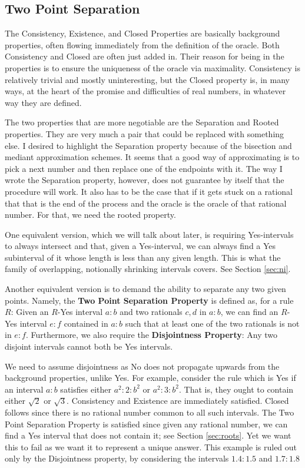 \documentclass[12pt]{article}
\begin{document}
\subsection{Two Point Separation}

The Consistency, Existence, and Closed Properties are basically background properties, often flowing immediately from the definition of the oracle. Both Consistency and Closed are often just added in. Their reason for being in the properties is to ensure the uniqueness of the oracle via maximality. Consistency is relatively trivial and mostly uninteresting, but the Closed property is, in many ways, at the heart of the promise and difficulties of real numbers, in whatever way they are defined. 

The two properties that are more negotiable are the Separation and Rooted properties. They are very much a pair that could be replaced with something else. I desired to highlight the Separation property because of the bisection and mediant approximation schemes. It seems that a good way of approximating is to pick a next number and then replace one of the endpoints with it. The way I wrote the Separation property, however, does not guarantee by itself that the procedure will work. It also has to be the case that if it gets stuck on a rational that that is the end of the process and the oracle is the oracle of that rational number. For that, we need the rooted property. 

One equivalent version, which we will talk about later, is requiring Yes-intervals to always intersect and that, given a Yes-interval, we can always find a Yes subinterval of it whose length is less than any given length. This is what the family of overlapping, notionally shrinking intervals covers. See Section \ref{sec:ni}.

Another equivalent version is to demand the ability to separate any two given points. Namely, the \textbf{Two Point Separation Property} is defined as, for a rule $R$: Given an $R$-Yes interval $a:b$ and two rationals $c,d$ in $a:b$, we can find an $R$-Yes interval $e:f$ contained in $a:b$ such that at least one of the two rationals is not in $e:f$. Furthermore, we also require the \textbf{Disjointness Property}: Any two disjoint intervals cannot both be Yes intervals. 

We need to assume disjointness as No does not propagate upwards from the background properties, unlike Yes. For example, consider the rule which is Yes if an interval $a:b$ satisfies either $a^2:2:b^2$ or $a^2:3:b^2$. That is, they ought to contain either $\sqrt{2}$ or $\sqrt{3}$. Consistency and Existence are immediately satisfied. Closed follows since there is no rational number common to all such intervals. The Two Point Separation Property is satisfied since given any rational number, we can find a Yes interval that does not contain it; see Section \ref{sec:roots}. Yet we want this to fail as we want it to represent a unique answer. This example is ruled out only by the Disjointness property, by considering the intervals $1.4:1.5$ and $1.7:1.8$
\end{document}
